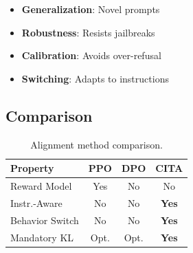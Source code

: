 \begin{itemize}
    \item \textbf{Generalization}: Novel prompts
    \item \textbf{Robustness}: Resists jailbreaks
    \item \textbf{Calibration}: Avoids over-refusal
    \item \textbf{Switching}: Adapts to instructions
\end{itemize}

\subsection{Comparison}

\begin{table}[H]
\centering
\footnotesize
\begin{tabular}{@{}lccc@{}}
\toprule
\textbf{Property} & \textbf{PPO} & \textbf{DPO} & \textbf{CITA} \\
\midrule
Reward Model & Yes & No & No \\
Instr.-Aware & No & No & \textbf{Yes} \\
Behavior Switch & No & No & \textbf{Yes} \\
Mandatory KL & Opt. & Opt. & \textbf{Yes} \\
\bottomrule
\end{tabular}
\caption{Alignment method comparison.}
\label{tab:method_comparison}
\end{table}

